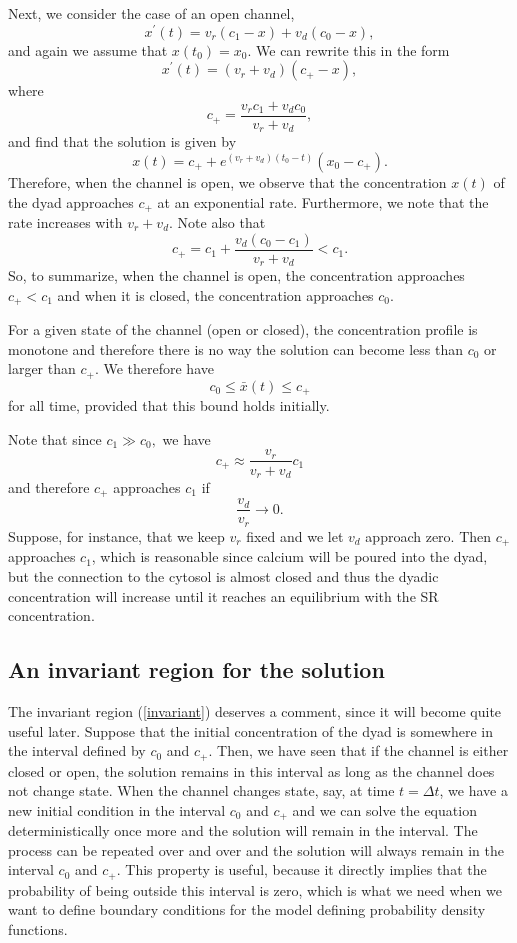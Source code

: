 Next, we consider the case of an open channel,
\begin{equation}
x^{\prime}(t)=v_{r}(c_{1}-x)+v_{d}(c_{0}-x), \label{open600}
\end{equation}
and again we assume that $x(t_0)=x_0.$
We can rewrite this in the form
\[
x^{\prime}(t)=(v_{r}+v_{d})\left(c_{+}-x\right),
\]
where
\[
c_{+}=\frac{v_{r}c_{1}+v_{d}c_{0}}{v_{r}+v_{d}},
\]
and find that the solution is given by
\[
x(t)=c_{+}+e^{\left(  v_{r}+v_{d}\right)
(t_{0}-t)}\left(  x_{0}-c_{+}\right).
\]
Therefore, when the channel is open, we observe that the concentration $x(t)$ of the dyad approaches $c_{+}$
at an exponential rate. Furthermore, we note that the rate increases with $v_{r}+v_{d}$.
Note also that
\begin{equation}
c_{+}  =c_{1}+\frac{v_{d}\left(  c_{0}-c_{1}\right)  }{v_{r}+v_{d}}<c_{1}.
\end{equation}
So, to summarize, when the channel is open, the concentration approaches  $c_+<c_1$ and when it is closed, the concentration approaches $c_0$. 

For a given state of the channel (open or closed), the concentration profile is monotone and therefore there is no way the solution
can become less than $c_0$ or larger than $c_+$. We therefore have
\begin{equation}
c_{0}\leqslant \bar{x}(t)\leqslant c_{+} \label{invariant}
\end{equation}
for all time, provided that this bound holds initially. 

Note that since $c_{1}\gg c_{0},$ we have
\[
c_{+}\approx\frac{v_{r}}{v_{r}+v_{d}}c_{1}
\]
and therefore $c_{+}$ approaches $c_{1}$ if 
\[\frac{v_{d}}{v_{r}}
\longrightarrow 0.\]
 Suppose, for instance, that we keep $v_{r}$ fixed and we let $ v_{d}$ approach zero. Then 
 $c_{+}$ approaches $c_{1}$, which is reasonable since calcium will be poured into the dyad, but the connection to the cytosol is almost closed and thus the 
dyadic concentration will increase until it reaches an equilibrium with the SR concentration.

\subsection{An invariant region for the solution}

The invariant region (\ref{invariant}) deserves a comment, since it will become quite useful later. Suppose that the initial concentration of the dyad is somewhere in the interval defined by $c_0$ and $c_+$. Then, we have seen that if the channel is either closed or open, the solution remains in this interval as long as the channel does not change state. When the channel changes state, say, at time $t=\Delta t$, we have a new initial condition in the interval $c_0$ and $c_+$ and we can solve the equation deterministically once more and the solution will remain in the interval. The process can be repeated over and over and the solution will always remain in the interval $c_0$ and $c_+$. This property is useful, because it directly implies that the probability of being outside this interval is zero, which is what we need when we want to define boundary conditions for the model defining probability density functions. 

